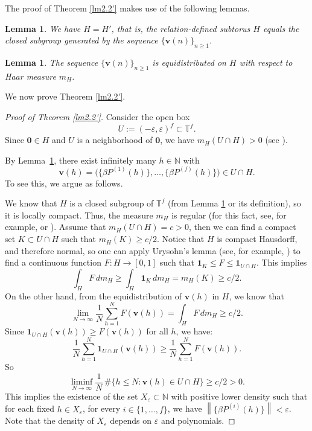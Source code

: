 \documentclass[11pt]{article}
\newtheorem{lemma}[theorem]{Lemma}
\def\N{{\mathbb  N}}
\newcommand{\nnorm}[1]{\left\|#1\right\|}
\theoremstyle{definition}
\newcommand{\T}{\mathbb T}
\begin{document}
The proof of Theorem \ref{lm2.2'} makes use of the following lemmas.
\begin{lemma}\label{lem:H=Hprime}
We have \(H=H'\), that is, the relation-defined subtorus $H$ equals the closed subgroup generated by the sequence $\{\mathbf v(n)\}_{n\ge 1}$.
\end{lemma}
\begin{lemma}\label{prop:weyl-H}
The sequence $\{\mathbf v(n)\}_{n\ge 1}$ is equidistributed on $H$ with respect to Haar measure $m_H$.
\end{lemma}

We now prove Theorem \ref{lm2.2'}.
\begin{proof}[Proof of Theorem \ref{lm2.2'}]
    Consider the open box
\[
U:=(-\varepsilon,\varepsilon)^f\subset\T^f.
\]
Since $\mathbf{0}\in H$ and $U$ is a neighborhood of $\mathbf{0}$, we have $m_H(U\cap H)>0$ (see \cite[page 341]{book0}).

By Lemma~\ref{prop:weyl-H}, there exist infinitely many $h\in\N$ with
\[
\mathbf v(h)=\big(\{\beta P^{(1)}(h)\},\dots,\{\beta P^{(f)}(h)\}\big)\in U\cap H.
\]
To see this, we argue as follows. 

We know that $H$ is a closed subgroup of $\mathbb{T}^f$ (from Lemma \ref{lem:H=Hprime} or its definition), so it is locally compact. Thus, the measure $m_H$ is regular (for this fact, see, for example, \cite[Chapter 2]{book0} or \cite[Chapter 44]{fre}). Assume that $m_H(U\cap H)=c>0$, then we can find a compact set $K\subset U\cap H$ such that $m_H(K)\ge c/2$. Notice that $H$ is compact Hausdorff, and therefore normal, so one can apply Urysohn's lemma (see, for example, \cite[Theorem 33.1]{munkres2000}) to find a continuous function $F\colon H\to [0, 1]$ such that $
\mathbf{1}_K \le F \le \mathbf{1}_{U\cap H}.$
This implies
\[
\int_H F\,dm_H \ge \int_H \mathbf{1}_K\,dm_H = m_H(K) \ge c/2.
\]
On the other hand, from the equidistribution of $\mathbf{v}(h)$ in $H$, we know that
\[
\lim_{N\to \infty}\frac{1}{N}\sum_{h=1}^N F(\mathbf{v}(h)) =\int_H F\,dm_H \ge c/2.
\]
Since $\mathbf{1}_{U\cap H}(\mathbf{v}(h)) \ge F(\mathbf{v}(h))$ for all $h$, we have:
\[
\frac{1}{N}\sum_{h=1}^N \mathbf{1}_{U\cap H}(\mathbf{v}(h)) \ge \frac{1}{N}\sum_{h=1}^N F(\mathbf{v}(h)).
\]
So
\[
\liminf_{N\to\infty} \frac{1}{N}\,\#\{h \le N: \mathbf{v}(h) \in U\cap H\} \ge c/2 > 0.
\]
This implies the existence of the set $X_\varepsilon\subset \mathbb{N}$ with positive lower density such that for each fixed $h\in X_\varepsilon$,  for every $i\in \{1,\dots,f\}$, we have $\nnorm{\{\beta P^{(i)}(h)\}}<\varepsilon$. Note that the density of $X_\varepsilon$ depends on $\varepsilon$ and polynomials.
\end{proof}
\end{document}
